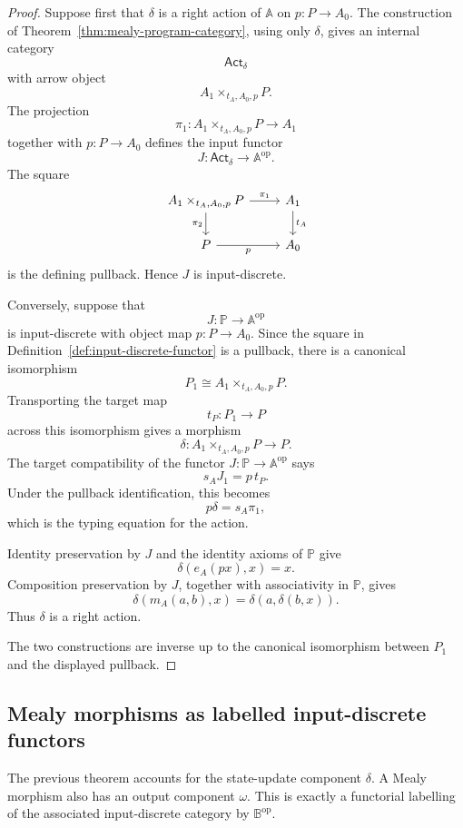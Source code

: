 \begin{proof}
Suppose first that \(\delta\) is a right action of \(\mathbb A\) on \(p:P\to A_0\). The construction of Theorem~\ref{thm:mealy-program-category}, using only \(\delta\), gives an internal category
\[
\mathsf{Act}_\delta
\]
with arrow object
\[
A_1\times_{t_A,A_0,p}P.
\]
The projection
\[
\pi_1:A_1\times_{t_A,A_0,p}P\to A_1
\]
together with \(p:P\to A_0\) defines the input functor
\[
J:\mathsf{Act}_\delta\to\mathbb A^{\mathrm{op}}.
\]
The square
\[
\begin{tikzcd}
A_1\times_{t_A,A_0,p}P \arrow[r, "\pi_1"] \arrow[d, "\pi_2"']
&
A_1 \arrow[d, "t_A"]
\\
P \arrow[r, "p"']
&
A_0
\end{tikzcd}
\]
is the defining pullback. Hence \(J\) is input-discrete.

Conversely, suppose that
\[
J:\mathbb P\to\mathbb A^{\mathrm{op}}
\]
is input-discrete with object map \(p:P\to A_0\). Since the square in Definition~\ref{def:input-discrete-functor} is a pullback, there is a canonical isomorphism
\[
P_1\cong A_1\times_{t_A,A_0,p}P.
\]
Transporting the target map
\[
t_P:P_1\to P
\]
across this isomorphism gives a morphism
\[
\delta:A_1\times_{t_A,A_0,p}P\to P.
\]
The target compatibility of the functor \(J:\mathbb P\to\mathbb A^{\mathrm{op}}\) says
\[
s_A J_1=p\,t_P.
\]
Under the pullback identification, this becomes
\[
p\delta=s_A\pi_1,
\]
which is the typing equation for the action.

Identity preservation by \(J\) and the identity axioms of \(\mathbb P\) give
\[
\delta(e_A(px),x)=x.
\]
Composition preservation by \(J\), together with associativity in \(\mathbb P\), gives
\[
\delta(m_A(a,b),x)=\delta(a,\delta(b,x)).
\]
Thus \(\delta\) is a right action.

The two constructions are inverse up to the canonical isomorphism between \(P_1\) and the displayed pullback.
\end{proof}

\subsection{Mealy morphisms as labelled input-discrete functors}

The previous theorem accounts for the state-update component \(\delta\). A Mealy morphism also has an output component \(\omega\). This is exactly a functorial labelling of the associated input-discrete category by \(\mathbb B^{\mathrm{op}}\).

